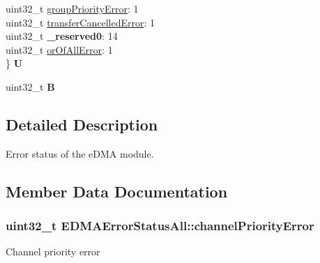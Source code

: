 \begin{DoxyCompactItemize}
\begin{tabbing}
\>uint32\_t \hyperlink{unionEDMAErrorStatusAll_a26c5c967c7f4fac2fc2bf566ebd44d0c}{groupPriorityError}: 1\\
\>uint32\_t \hyperlink{unionEDMAErrorStatusAll_af1d3f5878d0d18e3c39f13493e4d6f11}{transferCancelledError}: 1\\
\>uint32\_t {\bfseries \_reserved0}: 14\\
\>uint32\_t \hyperlink{unionEDMAErrorStatusAll_a87b34020417245ce5e7e8664f474f7a8}{orOfAllError}: 1\\
\} {\bfseries U}\hypertarget{unionEDMAErrorStatusAll_a17e20010014a3d0e0af748df75a88c6d}{}\label{unionEDMAErrorStatusAll_a17e20010014a3d0e0af748df75a88c6d}
\\

\end{tabbing}\item 
uint32\+\_\+t {\bfseries B}\hypertarget{unionEDMAErrorStatusAll_af0b7b7dd162e13577864986cd8766d27}{}\label{unionEDMAErrorStatusAll_af0b7b7dd162e13577864986cd8766d27}

\end{DoxyCompactItemize}


\subsection{Detailed Description}
Error status of the e\+D\+MA module. 

\subsection{Member Data Documentation}
\subsubsection[{\texorpdfstring{channel\+Priority\+Error}{channelPriorityError}}]{\setlength{\rightskip}{0pt plus 5cm}uint32\+\_\+t E\+D\+M\+A\+Error\+Status\+All\+::channel\+Priority\+Error}\hypertarget{unionEDMAErrorStatusAll_a1bd481a8b76321d64d1f8459d7477dac}{}\label{unionEDMAErrorStatusAll_a1bd481a8b76321d64d1f8459d7477dac}
Channel priority error 
